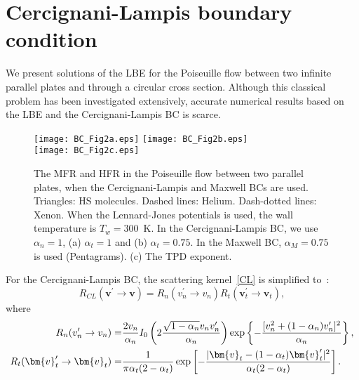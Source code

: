 %


\section{Cercignani-Lampis boundary condition}

We present solutions of the LBE for the Poiseuille flow between two infinite parallel plates and through a circular cross section. Although this classical problem has been investigated extensively, accurate numerical results based on the LBE and the Cercignani-Lampis  BC is scarce. 



\begin{figure}[t]
	\centering
	{	\texttt{[image: BC\_Fig2a.eps]}}
	{	\texttt{[image: BC\_Fig2b.eps]}}\\
	\vskip 0.3cm
	{	\texttt{[image: BC\_Fig2c.eps]}}
	\caption{
		The MFR and HFR in the Poiseuille flow between two parallel plates, when the Cercignani-Lampis and Maxwell BCs are used. Triangles: HS molecules. Dashed lines: Helium. Dash-dotted lines: Xenon. When the Lennard-Jones potentials is used, the wall temperature is $T_w=300$~K. In the Cercignani-Lampis   BC, we use $\alpha_n=1$,  (a) $\alpha_t=1$ and (b) $\alpha_t=0.75$. In the Maxwell   BC, $\alpha_M=0.75$ is used (Pentagrams). (c) The TPD exponent. 
	} 
	\label{Chapter_BC_Pois1D}
\end{figure}


For the Cercignani-Lampis  BC, the scattering kernel~\eqref{CL} is simplified
to~\citep{Sharipov2002CL,Sharipov2003CL,SharipovCL3}: 
\begin{equation}
R_{CL}(\bm{v}^{\prime}\rightarrow \bm{v})=R_n(v_n^{\prime}\rightarrow%
{v_n})R_t(\bm{v}_t^{\prime}\rightarrow{\bm{v}_t}),
\end{equation}
where 
\begin{equation*}  
\begin{aligned}[b] R_n(v_n'\rightarrow{v_n})=&\frac{2v_n}{\alpha_n}
I_0\left(2\frac{\sqrt{1-\alpha_n}v_nv_n'}{\alpha_n}\right)\exp\left\{-%
\frac{[v_n^2+(1-\alpha_n)v_n']^2}{\alpha_n} \right\},\\
R_t(\bm{v}_t'\rightarrow{\bm{v}_t})=&\frac{1}{\pi\alpha_t(2-%
	\alpha_t)}\exp\left[-\frac{|\bm{v}_t-(1-\alpha_t)\bm{v}_t'|^2}{%
	\alpha_t(2-\alpha_t)} \right]. 
\end{aligned}
\end{equation*}

